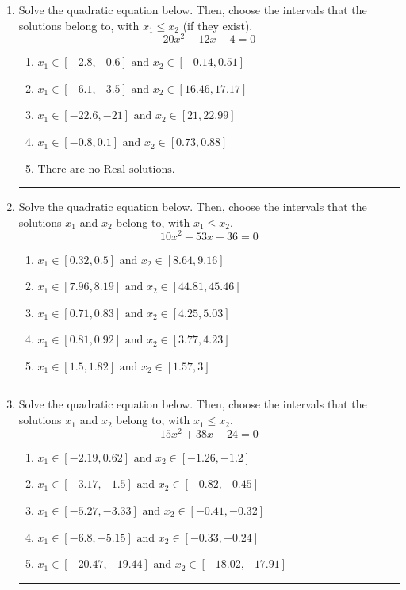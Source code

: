 \documentclass[14pt]{extbook}
\newcommand{\litem}[1]{\item#1\hspace*{-1cm}\rule{\textwidth}{0.4pt}}
\begin{document}
\begin{enumerate}
{\begin{enumerate}[label=\Alph*.]
\end{enumerate} }
\litem{
Solve the quadratic equation below. Then, choose the intervals that the solutions belong to, with $x_1 \leq x_2$ (if they exist).\[ 20x^{2} -12 x -4 = 0 \]\begin{enumerate}[label=\Alph*.]
\item \( x_1 \in [-2.8, -0.6] \text{ and } x_2 \in [-0.14, 0.51] \)
\item \( x_1 \in [-6.1, -3.5] \text{ and } x_2 \in [16.46, 17.17] \)
\item \( x_1 \in [-22.6, -21] \text{ and } x_2 \in [21, 22.99] \)
\item \( x_1 \in [-0.8, 0.1] \text{ and } x_2 \in [0.73, 0.88] \)
\item \( \text{There are no Real solutions.} \)

\end{enumerate} }
\litem{
Solve the quadratic equation below. Then, choose the intervals that the solutions $x_1$ and $x_2$ belong to, with $x_1 \leq x_2$.\[ 10x^{2} -53 x + 36 = 0 \]\begin{enumerate}[label=\Alph*.]
\item \( x_1 \in [0.32, 0.5] \text{ and } x_2 \in [8.64, 9.16] \)
\item \( x_1 \in [7.96, 8.19] \text{ and } x_2 \in [44.81, 45.46] \)
\item \( x_1 \in [0.71, 0.83] \text{ and } x_2 \in [4.25, 5.03] \)
\item \( x_1 \in [0.81, 0.92] \text{ and } x_2 \in [3.77, 4.23] \)
\item \( x_1 \in [1.5, 1.82] \text{ and } x_2 \in [1.57, 3] \)

\end{enumerate} }
\litem{
Solve the quadratic equation below. Then, choose the intervals that the solutions $x_1$ and $x_2$ belong to, with $x_1 \leq x_2$.\[ 15x^{2} +38 x + 24 = 0 \]\begin{enumerate}[label=\Alph*.]
\item \( x_1 \in [-2.19, 0.62] \text{ and } x_2 \in [-1.26, -1.2] \)
\item \( x_1 \in [-3.17, -1.5] \text{ and } x_2 \in [-0.82, -0.45] \)
\item \( x_1 \in [-5.27, -3.33] \text{ and } x_2 \in [-0.41, -0.32] \)
\item \( x_1 \in [-6.8, -5.15] \text{ and } x_2 \in [-0.33, -0.24] \)
\item \( x_1 \in [-20.47, -19.44] \text{ and } x_2 \in [-18.02, -17.91] \)


\end{enumerate}}
\end{enumerate}
\end{document}
